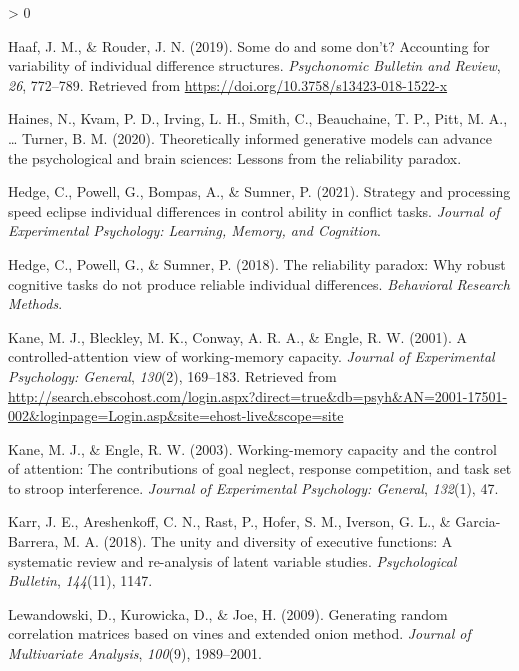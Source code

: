 \documentclass[
  english,
  ,man]{apa6}
\newlength{\cslhangindent}
\newenvironment{CSLReferences}[2] %
 {%
  \setlength{\parindent}{0pt}
  \ifodd #1 \everypar{\setlength{\hangindent}{\cslhangindent}}\ignorespaces\fi
  \ifnum #2 > 0
  \setlength{\parskip}{#2\baselineskip}
  \fi
 }%
 {}
\begin{document}
\begin{CSLReferences}{1}{0}
\leavevmode\hypertarget{ref-Haaf:Rouder:2019}{}%
Haaf, J. M., \& Rouder, J. N. (2019). Some do and some don't? {A}ccounting for variability of individual difference structures. \emph{Psychonomic Bulletin and Review}, \emph{26}, 772--789. Retrieved from \url{https://doi.org/10.3758/s13423-018-1522-x}

\leavevmode\hypertarget{ref-Haines.etal.2020}{}%
Haines, N., Kvam, P. D., Irving, L. H., Smith, C., Beauchaine, T. P., Pitt, M. A., \ldots{} Turner, B. M. (2020). Theoretically informed generative models can advance the psychological and brain sciences: {Lessons} from the reliability paradox.

\leavevmode\hypertarget{ref-Hedge.etal.2021}{}%
Hedge, C., Powell, G., Bompas, A., \& Sumner, P. (2021). Strategy and processing speed eclipse individual differences in control ability in conflict tasks. \emph{Journal of Experimental Psychology: Learning, Memory, and Cognition}.

\leavevmode\hypertarget{ref-Hedge:etal:2018}{}%
Hedge, C., Powell, G., \& Sumner, P. (2018). The reliability paradox: {W}hy robust cognitive tasks do not produce reliable individual differences. \emph{Behavioral Research Methods}.

\leavevmode\hypertarget{ref-Kane.etal.2001}{}%
Kane, M. J., Bleckley, M. K., Conway, A. R. A., \& Engle, R. W. (2001). A controlled-attention view of working-memory capacity. \emph{Journal of Experimental Psychology: General}, \emph{130}(2), 169--183. Retrieved from \url{http://search.ebscohost.com/login.aspx?direct=true\&db=psyh\&AN=2001-17501-002\&loginpage=Login.asp\&site=ehost-live\&scope=site}

\leavevmode\hypertarget{ref-Kane:Engle:2003}{}%
Kane, M. J., \& Engle, R. W. (2003). Working-memory capacity and the control of attention: The contributions of goal neglect, response competition, and task set to stroop interference. \emph{Journal of Experimental Psychology: General}, \emph{132}(1), 47.

\leavevmode\hypertarget{ref-Karr:etal:2018}{}%
Karr, J. E., Areshenkoff, C. N., Rast, P., Hofer, S. M., Iverson, G. L., \& Garcia-Barrera, M. A. (2018). The unity and diversity of executive functions: A systematic review and re-analysis of latent variable studies. \emph{Psychological Bulletin}, \emph{144}(11), 1147.

\leavevmode\hypertarget{ref-Lewandowski:etal:2009}{}%
Lewandowski, D., Kurowicka, D., \& Joe, H. (2009). Generating random correlation matrices based on vines and extended onion method. \emph{Journal of Multivariate Analysis}, \emph{100}(9), 1989--2001.


\end{CSLReferences}
\end{document}
